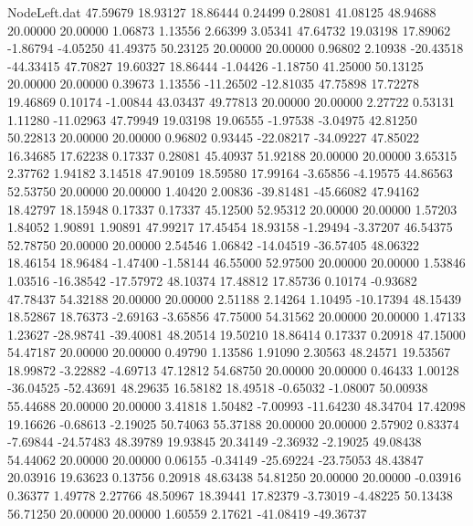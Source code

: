 \begin{filecontents}{NodeLeft.dat}
  47.59679   18.93127   18.86444     0.24499    0.28081   41.08125   48.94688   20.00000   20.00000    1.06873    1.13556    2.66399    3.05341
  47.64732   19.03198   17.89062    -1.86794   -4.05250   41.49375   50.23125   20.00000   20.00000    0.96802    2.10938  -20.43518  -44.33415
  47.70827   19.60327   18.86444    -1.04426   -1.18750   41.25000   50.13125   20.00000   20.00000    0.39673    1.13556  -11.26502  -12.81035
  47.75898   17.72278   19.46869     0.10174   -1.00844   43.03437   49.77813   20.00000   20.00000    2.27722    0.53131    1.11280  -11.02963
  47.79949   19.03198   19.06555    -1.97538   -3.04975   42.81250   50.22813   20.00000   20.00000    0.96802    0.93445  -22.08217  -34.09227
  47.85022   16.34685   17.62238     0.17337    0.28081   45.40937   51.92188   20.00000   20.00000    3.65315    2.37762    1.94182    3.14518
  47.90109   18.59580   17.99164    -3.65856   -4.19575   44.86563   52.53750   20.00000   20.00000    1.40420    2.00836  -39.81481  -45.66082
  47.94162   18.42797   18.15948     0.17337    0.17337   45.12500   52.95312   20.00000   20.00000    1.57203    1.84052    1.90891    1.90891
  47.99217   17.45454   18.93158    -1.29494   -3.37207   46.54375   52.78750   20.00000   20.00000    2.54546    1.06842  -14.04519  -36.57405
  48.06322   18.46154   18.96484    -1.47400   -1.58144   46.55000   52.97500   20.00000   20.00000    1.53846    1.03516  -16.38542  -17.57972
  48.10374   17.48812   17.85736     0.10174   -0.93682   47.78437   54.32188   20.00000   20.00000    2.51188    2.14264    1.10495  -10.17394
  48.15439   18.52867   18.76373    -2.69163   -3.65856   47.75000   54.31562   20.00000   20.00000    1.47133    1.23627  -28.98741  -39.40081
  48.20514   19.50210   18.86414     0.17337    0.20918   47.15000   54.47187   20.00000   20.00000    0.49790    1.13586    1.91090    2.30563
  48.24571   19.53567   18.99872    -3.22882   -4.69713   47.12812   54.68750   20.00000   20.00000    0.46433    1.00128  -36.04525  -52.43691
  48.29635   16.58182   18.49518    -0.65032   -1.08007   50.00938   55.44688   20.00000   20.00000    3.41818    1.50482   -7.00993  -11.64230
  48.34704   17.42098   19.16626    -0.68613   -2.19025   50.74063   55.37188   20.00000   20.00000    2.57902    0.83374   -7.69844  -24.57483
  48.39789   19.93845   20.34149    -2.36932   -2.19025   49.08438   54.44062   20.00000   20.00000    0.06155   -0.34149  -25.69224  -23.75053
  48.43847   20.03916   19.63623     0.13756    0.20918   48.63438   54.81250   20.00000   20.00000   -0.03916    0.36377    1.49778    2.27766
  48.50967   18.39441   17.82379    -3.73019   -4.48225   50.13438   56.71250   20.00000   20.00000    1.60559    2.17621  -41.08419  -49.36737

\end{filecontents}
